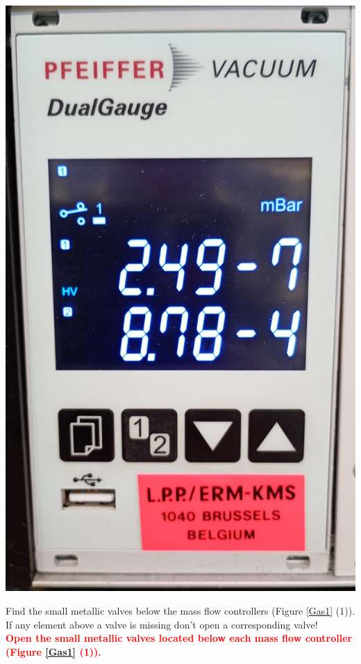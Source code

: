 \documentclass[fleqn,a4paper,20pt]{article}
\begin{document}
\begin{minipage}{.3\textwidth}
	\centering
	\includegraphics[width=\linewidth]{Pressure2}
\end{minipage}


\vspace{0.5cm}
Find the small metallic valves below the mass flow controllers (Figure \ref{Gas1} (1)). If any element above a valve is missing don’t open a corresponding valve! \\

\textcolor{red}{\textbf{Open the small metallic valves located below each mass flow controller (Figure \ref{Gas1} (1)).}}\\
\end{document}

